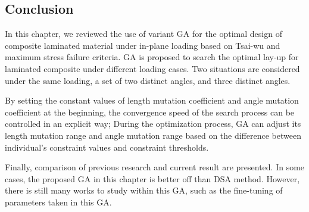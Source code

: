 \subsection{Conclusion}
In this chapter, we reviewed the use of variant GA for the optimal design of composite
laminated material under in-plane loading based on Tsai-wu and maximum stress
failure criteria. GA is proposed to search the optimal lay-up for laminated
composite under different loading cases. Two situations are considered under the same
loading, a set of two distinct angles, and three distinct angles. 

By setting the constant values of length mutation coefficient and angle mutation
coefficient at the beginning, the convergence speed of the search process can be
controlled in an explicit way; During the optimization process, GA can adjust
its length mutation range and angle mutation range based on the difference
between individual's constraint values and constraint thresholds.  

Finally, comparison of previous research and current result are presented. In
some cases, the proposed GA in this chapter is better off than DSA method.
However, there is still many works to study within this GA, such as the
fine-tuning of parameters taken in this GA.



